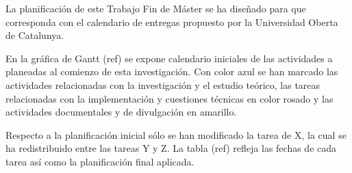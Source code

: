 La planificación de este Trabajo Fin de Máster se ha diseñado para que corresponda con el calendario de entregas propuesto por la Universidad Oberta de Catalunya.

En la gráfica de Gantt (ref) se expone calendario iniciales de las actividades a planeadas al comienzo de esta investigación. Con color azul se han marcado las actividades relacionadas con la investigación y el estudio teórico, las tareas relacionadas con la implementación y cuestiones técnicas en color rosado y las actividades documentales y de divulgación en amarillo.

Respecto a la planificación inicial sólo se han modificado la tarea de X, la cual se ha redistribuido entre las tareas Y y Z. La tabla (ref) refleja las fechas de cada tarea así como la planificación final aplicada.
